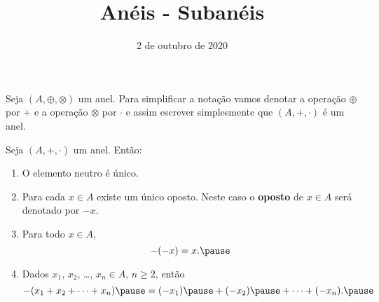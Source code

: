 \documentclass{beamer}
\title{Anéis - Subanéis}
\author[\autor]{\autor}
\institute[\instituto]{\instituto}
\date{2 de outubro de 2020}
\begin{document}
    \begin{frame}
        \maketitle
    \end{frame}

    
    \begin{frame}
        \begin{observacao}
            Seja $(A, \oplus, \otimes)$ \pause um anel. \pause Para simplificar a nota\c{c}\~ao \pause vamos denotar a opera\c{c}\~ao $\oplus$ \pause por $+$ \pause e a opera\c{c}\~ao $\otimes$ \pause por $\cdot$ \pause e assim escrever simplesmente \pause que $(A, +, \cdot)$ \pause \'e um anel.\pause
        \end{observacao}
    \end{frame}

    \begin{frame}
        \begin{proposicao}
            Seja $(A, + , \cdot)$ um anel. \pause Ent\~ao:\pause
            \begin{enumerate}[label={\roman*})]
                \item O elemento neutro {\'e} {\'u}nico.\pause

                \vspace{.5cm}

                \item Para cada $x \in A$ \pause existe um {\'u}nico oposto. \pause Neste caso o \textbf{oposto} de $x \in A$ \pause será denotado por $-x$.\pause

                \vspace{.5cm}
                
                \item Para todo $x \in A$, \pause
                \[
                    -(-x) = x.\pause
                \]

                \vspace{.5cm}
                
                \item Dados $x_{1}$, \pause $x_{2}$, \pause \dots, $x_n \in A$, \pause $n \geqslant 2$, \pause ent{\~a}o\pause
                \[
                    -(x_1 + x_2 + \dots + x_n) \pause = (-x_1) \pause + (-x_2) \pause + \dots + (-x_n).\pause
                \]

                \vspace{.2cm}

                \seti
            \end{enumerate}
        \end{proposicao}
    \end{frame}
\end{document}
